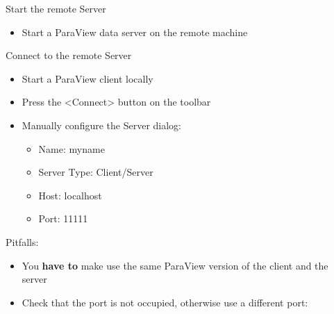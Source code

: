 \begin{frame}

    \begin{block}{Start the remote Server}
        \begin{itemize}
          \item Start a ParaView data server on the remote machine  
        \end{itemize}
    \end{block}

    \begin{block}{Connect to the remote Server}
        \begin{itemize}
          \item Start a ParaView client locally  
          \item Press the <Connect> button on the toolbar  
          \item Manually configure the Server dialog:
          \begin{itemize}
            \item Name: myname   
            \item Server Type: Client/Server  
            \item Host: localhost 
            \item Port: 11111 
          \end{itemize}
        \end{itemize}
    \end{block}
  Pitfalls:
    \begin{itemize}
      \item You \textbf{have to} make use the same ParaView version of the client and the server
      \item Check that the port is not occupied, otherwise use a different port: 
    \end{itemize}

\end{frame}

